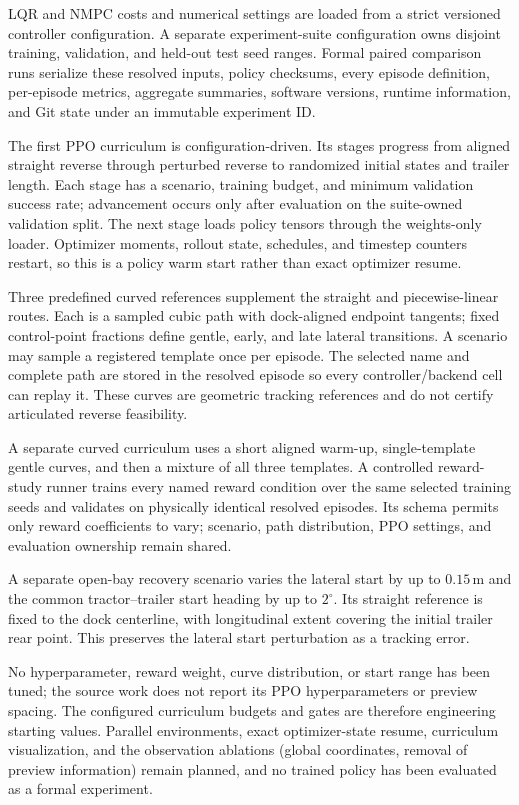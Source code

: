 \implemented{} LQR and NMPC costs and numerical settings are loaded from a
strict versioned controller configuration. A separate experiment-suite
configuration owns disjoint training, validation, and held-out test seed
ranges. Formal paired comparison runs serialize these resolved inputs, policy
checksums, every episode definition, per-episode metrics, aggregate summaries,
software versions, runtime information, and Git state under an immutable
experiment ID.

\implemented{} The first PPO curriculum is configuration-driven. Its stages
progress from aligned straight reverse through perturbed reverse to randomized
initial states and trailer length. Each stage has a scenario, training budget,
and minimum validation success rate; advancement occurs only after evaluation
on the suite-owned validation split. The next stage loads policy tensors
through the weights-only loader. Optimizer moments, rollout state, schedules,
and timestep counters restart, so this is a policy warm start rather than exact
optimizer resume.

\implemented{} Three predefined curved references supplement the straight and
piecewise-linear routes. Each is a sampled cubic path with dock-aligned
endpoint tangents; fixed control-point fractions define gentle, early, and late
lateral transitions. A scenario may sample a registered template once per
episode. The selected name and complete path are stored in the resolved episode
so every controller/backend cell can replay it. These curves are geometric
tracking references and do not certify articulated reverse feasibility.

\implemented{} A separate curved curriculum uses a short aligned warm-up,
single-template gentle curves, and then a mixture of all three templates. A
controlled reward-study runner trains every named reward condition over the
same selected training seeds and validates on physically identical resolved
episodes. Its schema permits only reward coefficients to vary; scenario,
path distribution, PPO settings, and evaluation ownership remain shared.

A separate open-bay recovery scenario varies the lateral start by up to
$0.15\,\mathrm{m}$ and the common tractor--trailer start heading by up to
$2^\circ$. Its straight reference is fixed to the dock centerline, with
longitudinal extent covering the initial trailer rear point. This preserves
the lateral start perturbation as a tracking error.

\planned{} No hyperparameter, reward weight, curve distribution, or start range has been tuned;
the source work does not report its PPO hyperparameters or preview spacing.
The configured curriculum budgets and gates are therefore engineering starting
values. Parallel environments, exact optimizer-state resume, curriculum
visualization, and the observation ablations (global coordinates, removal of
preview information) remain planned, and no trained policy has been evaluated
as a formal experiment.

